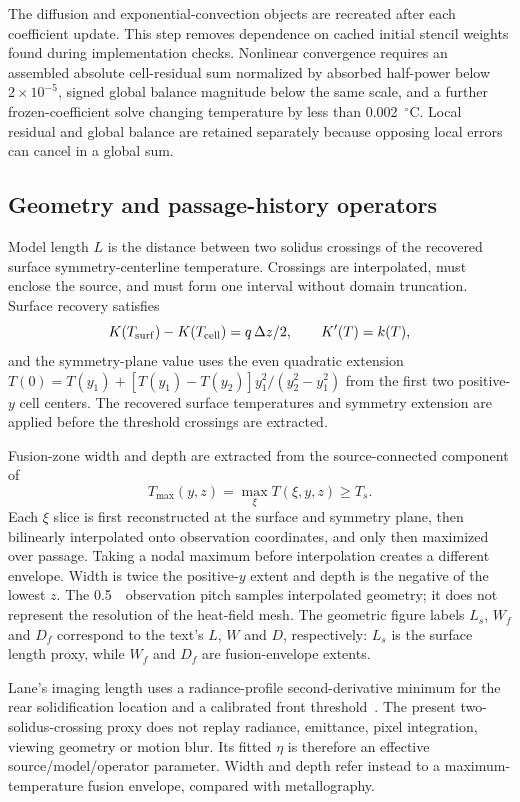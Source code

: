 The diffusion and exponential-convection objects are recreated after each coefficient update. This step removes dependence on cached initial stencil weights found during implementation checks. Nonlinear convergence requires an assembled absolute cell-residual sum normalized by absorbed half-power below $2\times10^{-5}$, signed global balance magnitude below the same scale, and a further frozen-coefficient solve changing temperature by less than 0.002~$^\circ$C. Local residual and global balance are retained separately because opposing local errors can cancel in a global sum.

\subsection{Geometry and passage-history operators}
Model length $L$ is the distance between two solidus crossings of the recovered surface symmetry-centerline temperature. Crossings are interpolated, must enclose the source, and must form one interval without domain truncation. Surface recovery satisfies
\begin{equation}
 K(T_{\rm surf})-K(T_{\rm cell})=q\,\Delta z/2,\qquad K'(T)=k(T),
\end{equation}
and the symmetry-plane value uses the even quadratic extension $T(0)=T(y_1)+[T(y_1)-T(y_2)]y_1^2/(y_2^2-y_1^2)$ from the first two positive-$y$ cell centers. The recovered surface temperatures and symmetry extension are applied before the threshold crossings are extracted.

Fusion-zone width and depth are extracted from the source-connected component of
\begin{equation}
 T_{\max}(y,z)=\max_\xi T(\xi,y,z)\geq T_s.
 \label{eq:fusion}
\end{equation}
Each $\xi$ slice is first reconstructed at the surface and symmetry plane, then bilinearly interpolated onto observation coordinates, and only then maximized over passage. Taking a nodal maximum before interpolation creates a different envelope. Width is twice the positive-$y$ extent and depth is the negative of the lowest $z$. The 0.5~\um\ observation pitch samples interpolated geometry; it does not represent the resolution of the heat-field mesh. The geometric figure labels $L_s$, $W_f$ and $D_f$ correspond to the text's $L$, $W$ and $D$, respectively: $L_s$ is the surface length proxy, while $W_f$ and $D_f$ are fusion-envelope extents.

Lane's imaging length uses a radiance-profile second-derivative minimum for the rear solidification location and a calibrated front threshold~\cite{lane2020}. The present two-solidus-crossing proxy does not replay radiance, emittance, pixel integration, viewing geometry or motion blur. Its fitted $\eta$ is therefore an effective source/model/operator parameter. Width and depth refer instead to a maximum-temperature fusion envelope, compared with metallography.

